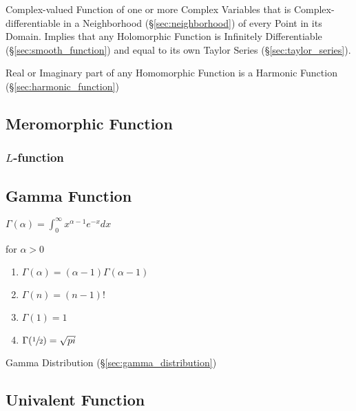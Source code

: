Complex-valued Function of one or more Complex Variables that is
Complex-differentiable in a Neighborhood (\S\ref{sec:neighborhood}) of
every Point in its Domain. Implies that any Holomorphic Function is
Infinitely Differentiable (\S\ref{sec:smooth_function}) and equal to
its own Taylor Series (\S\ref{sec:taylor_series}).

Real or Imaginary part of any Homomorphic Function is a Harmonic
Function (\S\ref{sec:harmonic_function})



\subsection{Meromorphic Function}\label{sec:meromorphic_function}

\subsubsection{$L$-function}\label{sec:l_function}

\subsection{Gamma Function}\label{sec:gamma_function}

$\Gamma(\alpha) = \int_0^{\infty} x^{\alpha -1} e^{-x} dx$

for $\alpha > 0$

\begin{enumerate}
\item $\Gamma(\alpha) = (\alpha - 1) \Gamma(\alpha -1)$
\item $\Gamma(n) = (n-1)!$
\item $\Gamma(1) = 1$
\item $\Gamma(\sfrac{1}{2}) = \sqrt{pi}$
\end{enumerate}

Gamma Distribution (\S\ref{sec:gamma_distribution})



\subsection{Univalent Function}\label{sec:univalent_function}

